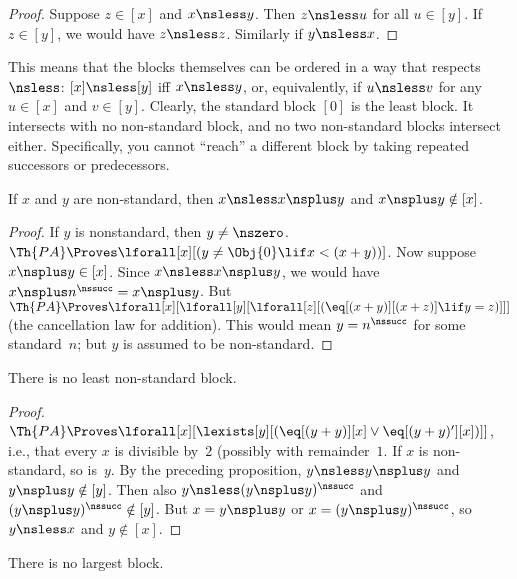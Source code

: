 \documentclass[../../../include/open-logic-section]{subfiles}
\begin{document}
\begin{proof}
Suppose $z \in [x]$ and $x \nsless y$. Then $z \nsless u$ for all $u
\in [y]$. If $z \in [y]$, we would have $z \nsless z$. Similarly if $y
\nsless x$.
\end{proof}

\begin{explain}
This means that the blocks themselves can be ordered in a way that
respects $\nsless$: $[x] \nsless [y]$ iff $x \nsless y$, or,
equivalently, if $u \nsless v$ for any $u \in [x]$ and $v \in [y]$.
Clearly, the standard block $[0]$ is the least block. It intersects
with no non-standard block, and no two non-standard blocks intersect
either. Specifically, you cannot ``reach'' a different block by taking
repeated successors or predecessors.
\end{explain}

\begin{prop}
If $x$ and $y$ are non-standard, then $x \nsless x \nsplus y$ and $x
\nsplus y \notin [x]$.
\end{prop}

\begin{proof}
If $y$ is nonstandard, then $y \neq \nszero$. $\Th{PA} \Proves
\lforall[x][(y \neq \Obj{0} \lif x < (x+y))]$.  Now suppose $x
\nsplus y \in [x]$. Since $x \nsless x \nsplus y$, we would have $x
\nsplus n^\nssucc = x \nsplus y$. But $\Th{PA} \Proves
\lforall[x][\lforall[y][\lforall[z][(\eq[(x+y)][(x+z)] \lif y = z)]]]$
(the cancellation law for addition). This would mean $y = n^\nssucc$
for some standard~$n$; but $y$ is assumed to be non-standard.
\end{proof}

\begin{prop}
There is no least non-standard block.
\end{prop}

\begin{proof}
$\Th{PA} \Proves \lforall[x][\lexists[y][(\eq[(y+y)][x] \lor
      \eq[(y+y)'][x])]]$, i.e., that every $x$ is divisible by~$2$
  (possibly with remainder~$1$. If $x$ is non-standard, so is~$y$. By
  the preceding proposition, $y \nsless y \nsplus y$ and $y \nsplus y
  \notin [y]$. Then also $y \nsless (y \nsplus y)^\nssucc$ and $(y
  \nsplus y)^\nssucc \notin [y]$. But $x = y \nsplus y$ or $x = (y
  \nsplus y)^\nssucc$, so $y \nsless x$ and $y \notin [x]$.
\end{proof}

\begin{prop}
There is no largest block.
\end{prop}
\end{document}
